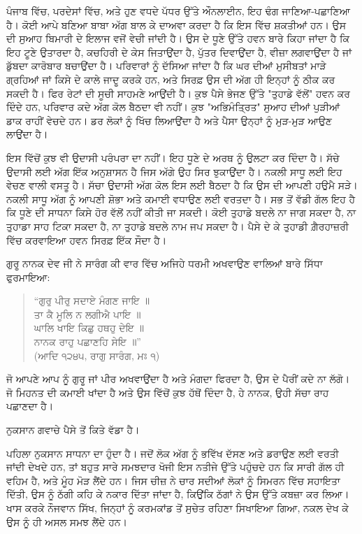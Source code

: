 \documentclass[12pt,a5paper,twoside]{book}  %
\begin{document}
{ਪੰਜਾਬ ਵਿੱਚ, ਪਰਦੇਸਾਂ ਵਿੱਚ, ਅਤੇ ਹੁਣ ਵਧਦੇ ਪੱਧਰ ਉੱਤੇ ਔਨਲਾਈਨ, ਇਹ ਢੰਗ ਜਾਣਿਆ-ਪਛਾਣਿਆ ਹੈ। ਕੋਈ ਆਪੇ ਬਣਿਆ ਬਾਬਾ ਅੱਗ ਬਾਲ ਕੇ ਦਾਅਵਾ ਕਰਦਾ ਹੈ ਕਿ ਇਸ ਵਿੱਚ ਸ਼ਕਤੀਆਂ ਹਨ। ਉਸ ਦੀ ਸੁਆਹ ਬਿਮਾਰੀ ਦੇ ਇਲਾਜ ਵਜੋਂ ਵੇਚੀ ਜਾਂਦੀ ਹੈ। ਉਸ ਦੇ ਧੂਣੇ ਉੱਤੇ ਹਵਨ ਬਾਰੇ ਕਿਹਾ ਜਾਂਦਾ ਹੈ ਕਿ ਇਹ ਟੂਣੇ ਉਤਾਰਦਾ ਹੈ, ਕਚਹਿਰੀ ਦੇ ਕੇਸ ਜਿਤਾਉਂਦਾ ਹੈ, ਪੁੱਤਰ ਦਿਵਾਉਂਦਾ ਹੈ, ਵੀਜ਼ਾ ਲਗਵਾਉਂਦਾ ਹੈ ਜਾਂ ਡੁੱਬਦਾ ਕਾਰੋਬਾਰ ਬਚਾਉਂਦਾ ਹੈ। ਪਰਿਵਾਰਾਂ ਨੂੰ ਦੱਸਿਆ ਜਾਂਦਾ ਹੈ ਕਿ ਘਰ ਦੀਆਂ ਮੁਸੀਬਤਾਂ ਮਾੜੇ ਗ੍ਰਹਿਆਂ ਜਾਂ ਕਿਸੇ ਦੇ ਕਾਲੇ ਜਾਦੂ ਕਰਕੇ ਹਨ, ਅਤੇ ਸਿਰਫ਼ ਉਸ ਦੀ ਅੱਗ ਹੀ ਇਨ੍ਹਾਂ ਨੂੰ ਠੀਕ ਕਰ ਸਕਦੀ ਹੈ। ਫਿਰ ਰੇਟਾਂ ਦੀ ਸੂਚੀ ਸਾਹਮਣੇ ਆਉਂਦੀ ਹੈ। ਕੁਝ ਪੈਸੇ ਭੇਜਣ ਉੱਤੇ "ਤੁਹਾਡੇ ਵੱਲੋਂ" ਹਵਨ ਕਰ ਦਿੰਦੇ ਹਨ, ਪਰਿਵਾਰ ਕਦੇ ਅੱਗ ਕੋਲ ਬੈਠਦਾ ਵੀ ਨਹੀਂ। ਕੁਝ "ਅਭਿਮੰਤ੍ਰਿਤ" ਸੁਆਹ ਦੀਆਂ ਪੁੜੀਆਂ ਡਾਕ ਰਾਹੀਂ ਵੇਚਦੇ ਹਨ। ਡਰ ਲੋਕਾਂ ਨੂੰ ਖਿੱਚ ਲਿਆਉਂਦਾ ਹੈ ਅਤੇ ਪੈਸਾ ਉਨ੍ਹਾਂ ਨੂੰ ਮੁੜ-ਮੁੜ ਆਉਣ ਲਾਉਂਦਾ ਹੈ।

ਇਸ ਵਿੱਚੋਂ ਕੁਝ ਵੀ ਉਦਾਸੀ ਪਰੰਪਰਾ ਦਾ ਨਹੀਂ। ਇਹ ਧੂਣੇ ਦੇ ਅਰਥ ਨੂੰ ਉਲਟਾ ਕਰ ਦਿੰਦਾ ਹੈ। ਸੱਚੇ ਉਦਾਸੀ ਲਈ ਅੱਗ ਇੱਕ ਅਨੁਸ਼ਾਸਨ ਹੈ ਜਿਸ ਅੱਗੇ ਉਹ ਸਿਰ ਝੁਕਾਉਂਦਾ ਹੈ। ਨਕਲੀ ਸਾਧੂ ਲਈ ਇਹ ਵੇਚਣ ਵਾਲੀ ਵਸਤੂ ਹੈ। ਸੱਚਾ ਉਦਾਸੀ ਅੱਗ ਕੋਲ ਇਸ ਲਈ ਬੈਠਦਾ ਹੈ ਕਿ ਉਸ ਦੀ ਆਪਣੀ ਹਉਮੈ ਸੜੇ। ਨਕਲੀ ਸਾਧੂ ਅੱਗ ਨੂੰ ਆਪਣੀ ਸ਼ੋਭਾ ਅਤੇ ਕਮਾਈ ਵਧਾਉਣ ਲਈ ਵਰਤਦਾ ਹੈ। ਸਭ ਤੋਂ ਵੱਡੀ ਗੱਲ ਇਹ ਹੈ ਕਿ ਧੂਣੇ ਦੀ ਸਾਧਨਾ ਕਿਸੇ ਹੋਰ ਵੱਲੋਂ ਨਹੀਂ ਕੀਤੀ ਜਾ ਸਕਦੀ। ਕੋਈ ਤੁਹਾਡੇ ਬਦਲੇ ਨਾ ਜਾਗ ਸਕਦਾ ਹੈ, ਨਾ ਤੁਹਾਡਾ ਸਾਹ ਟਿਕਾ ਸਕਦਾ ਹੈ, ਨਾ ਤੁਹਾਡੇ ਬਦਲੇ ਨਾਮ ਜਪ ਸਕਦਾ ਹੈ। ਪੈਸੇ ਦੇ ਕੇ ਤੁਹਾਡੀ ਗ਼ੈਰਹਾਜ਼ਰੀ ਵਿੱਚ ਕਰਵਾਇਆ ਹਵਨ ਸਿਰਫ਼ ਇੱਕ ਸੌਦਾ ਹੈ।

ਗੁਰੂ ਨਾਨਕ ਦੇਵ ਜੀ ਨੇ ਸਾਰੰਗ ਕੀ ਵਾਰ ਵਿੱਚ ਅਜਿਹੇ ਧਰਮੀ ਅਖਵਾਉਣ ਵਾਲਿਆਂ ਬਾਰੇ ਸਿੱਧਾ ਫੁਰਮਾਇਆ:

\begin{quote}
“ਗੁਰੁ ਪੀਰੁ ਸਦਾਏ ਮੰਗਣ ਜਾਇ ॥ \\
ਤਾ ਕੈ ਮੂਲਿ ਨ ਲਗੀਐ ਪਾਇ ॥ \\
ਘਾਲਿ ਖਾਇ ਕਿਛੁ ਹਥਹੁ ਦੇਇ ॥ \\
ਨਾਨਕ ਰਾਹੁ ਪਛਾਣਹਿ ਸੇਇ ॥” \\
(ਆਦਿ ੧੨੪੫, ਰਾਗੁ ਸਾਰੰਗ, ਮਃ ੧)
\end{quote}
ਜੋ ਆਪਣੇ ਆਪ ਨੂੰ ਗੁਰੂ ਜਾਂ ਪੀਰ ਅਖਵਾਉਂਦਾ ਹੈ ਅਤੇ ਮੰਗਦਾ ਫਿਰਦਾ ਹੈ, ਉਸ ਦੇ ਪੈਰੀਂ ਕਦੇ ਨਾ ਲੱਗੋ। ਜੋ ਮਿਹਨਤ ਦੀ ਕਮਾਈ ਖਾਂਦਾ ਹੈ ਅਤੇ ਉਸ ਵਿੱਚੋਂ ਕੁਝ ਹੱਥੋਂ ਦਿੰਦਾ ਹੈ, ਹੇ ਨਾਨਕ, ਉਹੀ ਸੱਚਾ ਰਾਹ ਪਛਾਣਦਾ ਹੈ।

ਨੁਕਸਾਨ ਗਵਾਚੇ ਪੈਸੇ ਤੋਂ ਕਿਤੇ ਵੱਡਾ ਹੈ।

ਪਹਿਲਾ ਨੁਕਸਾਨ ਸਾਧਨਾ ਦਾ ਹੁੰਦਾ ਹੈ। ਜਦੋਂ ਲੋਕ ਅੱਗ ਨੂੰ ਭਵਿੱਖ ਦੱਸਣ ਅਤੇ ਡਰਾਉਣ ਲਈ ਵਰਤੀ ਜਾਂਦੀ ਦੇਖਦੇ ਹਨ, ਤਾਂ ਬਹੁਤ ਸਾਰੇ ਸਮਝਦਾਰ ਖੋਜੀ ਇਸ ਨਤੀਜੇ ਉੱਤੇ ਪਹੁੰਚਦੇ ਹਨ ਕਿ ਸਾਰੀ ਗੱਲ ਹੀ ਵਹਿਮ ਹੈ, ਅਤੇ ਮੂੰਹ ਮੋੜ ਲੈਂਦੇ ਹਨ। ਜਿਸ ਚੀਜ਼ ਨੇ ਚਾਰ ਸਦੀਆਂ ਲੋਕਾਂ ਨੂੰ ਸਿਮਰਨ ਵਿੱਚ ਸਹਾਇਤਾ ਦਿੱਤੀ, ਉਸ ਨੂੰ ਠੱਗੀ ਕਹਿ ਕੇ ਨਕਾਰ ਦਿੱਤਾ ਜਾਂਦਾ ਹੈ, ਕਿਉਂਕਿ ਠੱਗਾਂ ਨੇ ਉਸ ਉੱਤੇ ਕਬਜ਼ਾ ਕਰ ਲਿਆ। ਖਾਸ ਕਰਕੇ ਨੌਜਵਾਨ ਸਿੱਖ, ਜਿਨ੍ਹਾਂ ਨੂੰ ਕਰਮਕਾਂਡ ਤੋਂ ਸੁਚੇਤ ਰਹਿਣਾ ਸਿਖਾਇਆ ਗਿਆ, ਨਕਲ ਦੇਖ ਕੇ ਉਸ ਨੂੰ ਹੀ ਅਸਲ ਸਮਝ ਲੈਂਦੇ ਹਨ।

}
\end{document}
